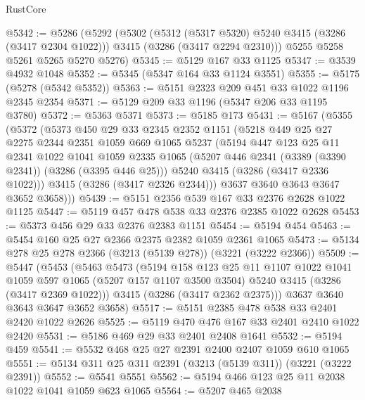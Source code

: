 \begin{lexlean}{RustCore}
\begin{coremodule}
@5342 := @5286
    (@5292
      (@5302
        (@5312 (@5317 @5320) @5240 @3415 (@3286 (@3417 @2304 @1022)))
        @3415
        (@3286 (@3417 @2294 @2310)))
      @5255
      @5258
      @5261
      @5265
      @5270
      @5276)
@5345 := @5129 @167 @33 @1125
@5347 := @3539 @4932 @1048
@5352 := @5345 (@5347 @164 @33 @1124 @3551)
@5355 := @5175 (@5278 (@5342 @5352))
@5363 := @5151 @2323 @209 @451 @33 @1022 @1196 @2345 @2354
@5371 := @5129 @209 @33 @1196 (@5347 @206 @33 @1195 @3780)
@5372 := @5363 @5371
@5373 := @5185 @173
@5431 := @5167
    (@5355
      (@5372
        (@5373
          @450
          @29
          @33
          @2345
          @2352
          @1151
          (@5218
            @449
            @25
            @27
            @2275
            @2344
            @2351
            @1059
            @669
            @1065
            @5237
            (@5194
              @447
              @123
              @25
              @11
              @2341
              @1022
              @1041
              @1059
              @2335
              @1065
              (@5207 @446 @2341 (@3389 (@3390 @2341)) (@3286 (@3395 @446 @25)))
              @5240
              @3415
              (@3286 (@3417 @2336 @1022)))
            @3415
            (@3286 (@3417 @2326 @2344)))
          @3637
          @3640
          @3643
          @3647
          @3652
          @3658)))
@5439 := @5151 @2356 @539 @167 @33 @2376 @2628 @1022 @1125
@5447 := @5119 @457 @478 @538 @33 @2376 @2385 @1022 @2628
@5453 := @5373 @456 @29 @33 @2376 @2383 @1151
@5454 := @5194 @454
@5463 := @5454 @160 @25 @27 @2366 @2375 @2382 @1059 @2361 @1065
@5473 := @5134 @278 @25 @278 @2366 (@3213 (@5139 @278)) (@3221 (@3222 @2366))
@5509 := @5447
    (@5453
      (@5463
        @5473
        (@5194
          @158
          @123
          @25
          @11
          @1107
          @1022
          @1041
          @1059
          @597
          @1065
          (@5207 @157 @1107 @3500 @3504)
          @5240
          @3415
          (@3286 (@3417 @2369 @1022)))
        @3415
        (@3286 (@3417 @2362 @2375)))
      @3637
      @3640
      @3643
      @3647
      @3652
      @3658)
@5517 := @5151 @2385 @478 @538 @33 @2401 @2420 @1022 @2626
@5525 := @5119 @470 @476 @167 @33 @2401 @2410 @1022 @2420
@5531 := @5186 @469 @29 @33 @2401 @2408 @1641
@5532 := @5194 @459
@5541 := @5532 @468 @25 @27 @2391 @2400 @2407 @1059 @610 @1065
@5551 := @5134 @311 @25 @311 @2391 (@3213 (@5139 @311)) (@3221 (@3222 @2391))
@5552 := @5541 @5551
@5562 := @5194 @466 @123 @25 @11 @2038 @1022 @1041 @1059 @623 @1065
@5564 := @5207 @465 @2038

\end{coremodule}
\end{lexlean}
